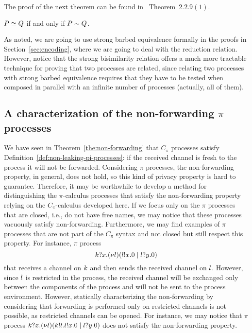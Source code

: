The proof of the next theorem can be found in~\cite{pi_calculus} Theorem~$2.2.9(1)$.

\begin{theorem}\label{th:strong_characterization}
$P\simeq Q$ if and only if $P\sim Q$.
\end{theorem}

As noted, we are going to use strong barbed equivalence formally in the proofs in Section~\ref{sec:encoding}, where we are going to deal with the reduction relation. However, notice that the strong bisimilarity relation offers a much more tractable technique for proving that two processes are related, since relating two processes with strong barbed equivalence requires that they have to be tested when composed in parallel with an infinite number of processes (actually, all of them).


\subsection{A characterization of the non-forwarding $\pi$ processes}\label{sec:the_non-forwarding_of_pi_processes}

We have seen in Theorem~\ref{the:non-forwarding} that $C_\pi$ processes satisfy Definition~\ref{def:non-leaking-pi-processes}: if the received channel is fresh to the process it will not be forwarded. 
Considering $\pi$ processes, the non-forwarding property, in general, does not hold, so this kind of privacy property is hard to guarantee. 
Therefore, it may be worthwhile to develop a method for distinguishing the $\pi$-calculus processes that satisfy the non-forwarding property relying on the $C_\pi$-calculus developed here.
If we focus only on the $\pi$ processes that are closed, i.e., do not have free names, we may notice that these processes vacuously satisfy non-forwarding.
Furthermore, we may find examples of $\pi$ processes that are not part of the $C_\pi$ syntax and not closed but still respect this property. 
For instance, $\pi$ process 
\[
k?x.(\nu l)(l!x.0 \;|\; l?y.0)
\]
that receives a channel on $k$ and then sends the received channel on $l$. However, since $l$ is restricted in the process, the received channel will be exchanged only between the components of the process and will not be sent to the process environment. However, statically characterizing the non-forwarding by considering that forwarding is performed only on restricted channels is not possible, as restricted channels can be opened. For instance, we may notice that $\pi$ process 
$k?x.(\nu l)(k!l.l!x.0 \;|\; l?y.0)$ 
does not satisfy the non-forwarding %
property.

